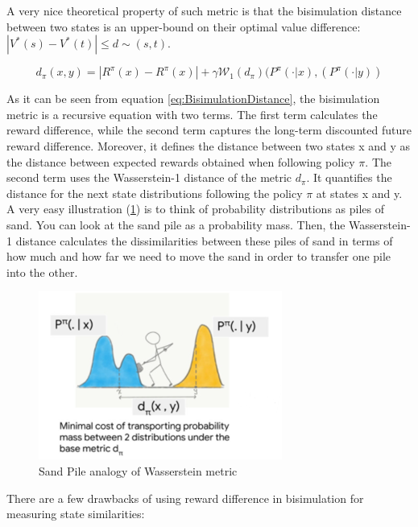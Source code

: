 \documentclass{usiinftr}
\begin{document}
A very nice theoretical property of such metric is that the bisimulation distance between two states is an upper-bound on their optimal value difference: $|V^*(s) - V^*(t)| \leq d \sim (s,t)$. 

\begin{equation}\label{eq:BisimulationDistance}
    d_{\pi}(x,y) = |R^{\pi}(x) - R^{\pi}(x)| + \gamma \mathcal{W}_1(d_{\pi}) (P^{\pi}(\cdot | x), (P^{\pi}(\cdot | y)) 
\end{equation}

As it can be seen from equation \ref{eq:BisimulationDistance}, the bisimulation metric is a recursive equation with two terms. The first term calculates the reward difference, while the second term captures the long-term discounted future reward difference. Moreover, it defines the distance between two states x and y as the distance between expected rewards obtained when following policy $\pi$. The second term uses the Wasserstein-1 distance of the metric $d_{\pi}$. It quantifies the distance for the next state distributions following the policy $\pi$ at states x and y. A very easy illustration (\ref{fig:SandPile}) is to think of probability distributions as piles of sand. You can look at the sand pile as a probability mass. Then, the Wasserstein-1 distance calculates the dissimilarities between these piles of sand in terms of how much and how far we need to move the sand in order to transfer one pile into the other.

\begin{figure}[h]
    \centering
    \includegraphics[width = 0.5\linewidth]{figures/image6.png}
    \caption{Sand Pile analogy of Wasserstein metric}
    \label{fig:SandPile}
\end{figure}

There are a few drawbacks of using reward difference in bisimulation for measuring state similarities:
\end{document}
